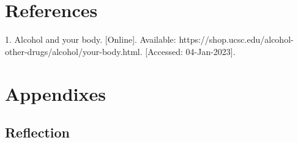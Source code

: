\documentclass{article}
\begin{document}
\section{References}
   1. Alcohol and your body. [Online]. Available: https://shop.ucsc.edu/alcohol-other-drugs/alcohol/your-body.html. [Accessed: 04-Jan-2023]. 
\newpage
\section{Appendixes}
\subsection{Reflection}

\end{document}
